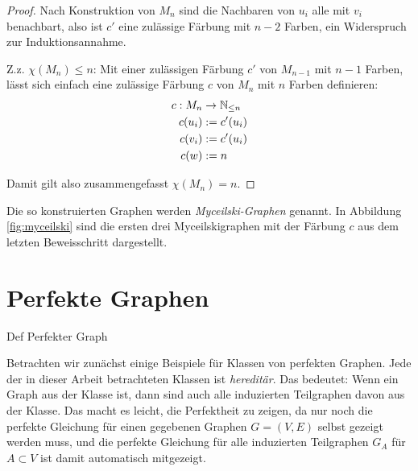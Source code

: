 \documentclass[../main.tex]{subfiles}
\begin{document}
\begin{proof}
    Nach Konstruktion von $M_n$ sind die Nachbaren von $u_i$ alle mit $v_i$ benachbart, also ist $c'$ eine zulässige Färbung mit $n-2$ Farben, ein Widerspruch zur Induktionsannahme.

    Z.z. $\chi(M_n) \leq n$: Mit einer zulässigen Färbung $c'$ von $M_{n-1}$ mit $n-1$ Farben, lässt sich einfach eine zulässige Färbung $c$ von $M_n$ mit $n$ Farben definieren:
    \begin{align*}
        c : M_n &\to \mathbb{N}_{\leq n} \\
        c(u_i) &:= c'(u_i) \\
        c(v_i) &:= c'(u_i) \\
        c(w) &:= n
    \end{align*}

    Damit gilt also zusammengefasst $\chi(M_n) = n$.
\end{proof}

Die so konstruierten Graphen werden \emph{Myceilski-Graphen} genannt. In Abbildung \ref{fig:myceilski} sind die ersten drei Myceilskigraphen mit der Färbung $c$ aus dem letzten Beweisschritt dargestellt.

\section{Perfekte Graphen}

Def Perfekter Graph


Betrachten wir zunächst einige Beispiele für Klassen von perfekten Graphen. Jede der in dieser Arbeit betrachteten Klassen ist \emph{hereditär}. Das bedeutet: Wenn ein Graph aus der Klasse ist, dann sind auch alle induzierten Teilgraphen davon aus der Klasse. Das macht es leicht, die Perfektheit zu zeigen, da nur noch die perfekte Gleichung für einen gegebenen Graphen $G = (V, E)$ selbst gezeigt werden muss, und die perfekte Gleichung für alle induzierten Teilgraphen $G_A$ für $A \subset V$ ist damit automatisch mitgezeigt.
\end{document}
